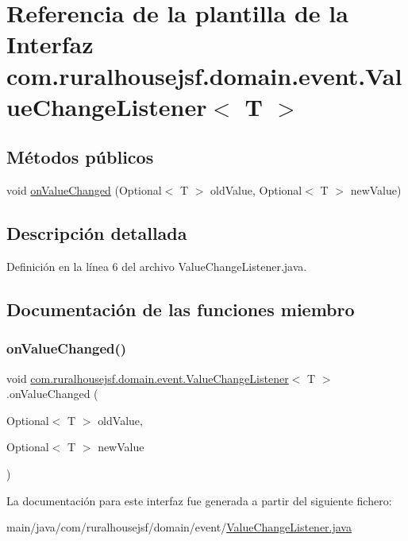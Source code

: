 \hypertarget{interfacecom_1_1ruralhousejsf_1_1domain_1_1event_1_1_value_change_listener}{}\section{Referencia de la plantilla de la Interfaz com.\+ruralhousejsf.\+domain.\+event.\+Value\+Change\+Listener$<$ T $>$}
\label{interfacecom_1_1ruralhousejsf_1_1domain_1_1event_1_1_value_change_listener}
\subsection*{Métodos públicos}
\begin{DoxyCompactItemize}
\item 
void \mbox{\hyperlink{interfacecom_1_1ruralhousejsf_1_1domain_1_1event_1_1_value_change_listener_a415b70f14683821f1674cd6bb1293904}{on\+Value\+Changed}} (Optional$<$ T $>$ old\+Value, Optional$<$ T $>$ new\+Value)
\end{DoxyCompactItemize}


\subsection{Descripción detallada}


Definición en la línea 6 del archivo Value\+Change\+Listener.\+java.



\subsection{Documentación de las funciones miembro}
\mbox{\label{interfacecom_1_1ruralhousejsf_1_1domain_1_1event_1_1_value_change_listener_a415b70f14683821f1674cd6bb1293904}} 
\subsubsection{\texorpdfstring{onValueChanged()}{onValueChanged()}}
{\footnotesize\ttfamily void \mbox{\hyperlink{interfacecom_1_1ruralhousejsf_1_1domain_1_1event_1_1_value_change_listener}{com.\+ruralhousejsf.\+domain.\+event.\+Value\+Change\+Listener}}$<$ T $>$.on\+Value\+Changed (\begin{DoxyParamCaption}\item[{Optional$<$ T $>$}]{old\+Value,  }\item[{Optional$<$ T $>$}]{new\+Value }\end{DoxyParamCaption})}



La documentación para este interfaz fue generada a partir del siguiente fichero\+:\begin{DoxyCompactItemize}
\item 
main/java/com/ruralhousejsf/domain/event/\mbox{\hyperlink{_value_change_listener_8java}{Value\+Change\+Listener.\+java}}\end{DoxyCompactItemize}
